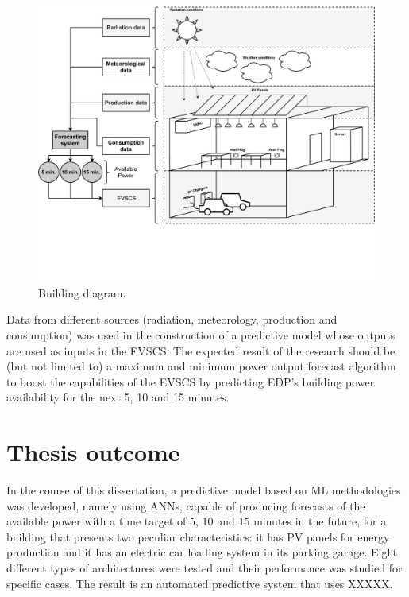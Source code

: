 \begin{figure}[h!]
    \centering
    \begin{center}
    \includegraphics[width=1\textwidth]{Images/BUILDING.png}
    \caption{Building diagram.}
    \label{building}
    \end{center}
\end{figure}

Data from different sources (radiation, meteorology, production and consumption) was used in the construction of a predictive model whose outputs are used as inputs in the \ac{EVSCS}. The expected result of the research should be (but not limited to) a maximum and minimum power output forecast algorithm to boost the capabilities of the \ac{EVSCS} by predicting \ac{EDP}'s building power availability for the next 5, 10 and 15 minutes.

\section{Thesis outcome}


In the course of this dissertation, a predictive model based on \ac{ML} methodologies was developed, namely using \ac{ANN}s, capable of producing forecasts of the available power with a time target of 5, 10 and 15 minutes in the future, for a building that presents two peculiar characteristics: it has  \ac{PV} panels for energy production and it has an electric car loading system in its parking garage. Eight different types of architectures were tested and their performance was studied for specific cases. The result is an automated predictive system that uses XXXXX.

